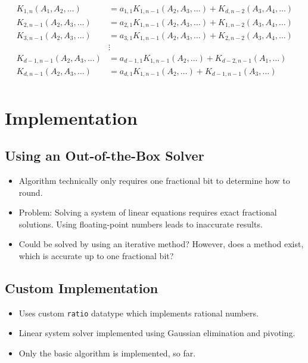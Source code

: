 \documentclass[english,version-2020-11]{uzl-thesis}
\begin{document}
\begin{align*}
  K_{1,n}(A_1, A_2, \dots)     & = a_{1,1} K_{1,n-1}(A_2, A_3, \dots) + K_{d,n-2}(A_3, A_4, \dots) \\
  K_{2,n-1}(A_2, A_3, \dots)   & = a_{2,1} K_{1,n-1}(A_2, A_3, \dots) + K_{1,n-2}(A_3, A_4, \dots) \\
  K_{3,n-1}(A_2, A_3, \dots)   & = a_{3,1} K_{1,n-1}(A_2, A_3, \dots) + K_{2,n-2}(A_3, A_4, \dots) \\
                               & \vdots                                                            \\
  K_{d-1,n-1}(A_2, A_3, \dots) & = a_{d-1,1} K_{1,n-1}(A_2, \dots) + K_{d-2,n-1}(A_1, \dots)       \\
  K_{d,n-1}(A_2, A_3, \dots)   & = a_{d,1}   K_{1,n-1}(A_2, \dots) + K_{d-1,n-1}(A_3, \dots)       \\
\end{align*}

\chapter{Implementation}

\section{Using an Out-of-the-Box Solver}

\begin{itemize}
  \item Algorithm technically only requires one fractional bit to determine how to round.
  \item Problem: Solving a system of linear equations requires exact fractional solutions.
    Using floating-point numbers leads to inaccurate results.
  \item Could be solved by using an iterative method? However, does a method
    exist, which is accurate up to one fractional bit?
\end{itemize}

\section{Custom Implementation}

\begin{itemize}
  \item Uses custom \texttt{ratio} datatype which implements rational numbers.
  \item Linear system solver implemented using Gaussian elimination and pivoting.
  \item Only the basic algorithm is implemented, so far.
\end{itemize}

\begin{bibtex-entries}
\end{bibtex-entries}
\end{document}
